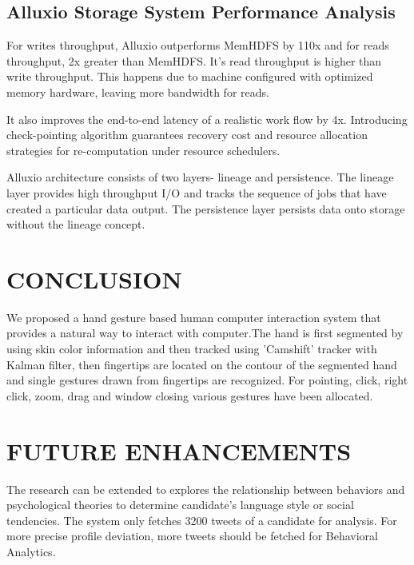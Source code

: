 \documentclass[oneside,a4paper,12pt]{pictreport}
\begin{document}
\section{Alluxio Storage System Performance Analysis}
\hspace{1.1cm}For writes throughput, Alluxio outperforms MemHDFS by 110x and for reads throughput, 2x greater than MemHDFS. It's read throughput is higher than write throughput. This happens due to machine configured with optimized memory hardware, leaving more bandwidth for reads.
\par It also improves the end-to-end latency of a realistic work flow by 4x. Introducing check-pointing algorithm guarantees recovery cost and resource allocation strategies for re-computation under resource schedulers.
\par Alluxio architecture consists of two layers- lineage and persistence. The
lineage layer provides high throughput I/O and tracks the sequence of jobs that have created a particular data output. The persistence layer persists data onto storage without the lineage concept.


\chapter{CONCLUSION}
We proposed a hand gesture based human computer
interaction system that provides a  natural  way to interact with computer.The hand is first segmented  by using skin color information and then tracked using 'Camshift' tracker with Kalman filter, then fingertips are located on the contour of the segmented hand and single gestures drawn from fingertips are recognized. For  pointing, click, right click, zoom, drag and window closing various gestures have been allocated.

\chapter{FUTURE ENHANCEMENTS} 
The research can be extended to explores the relationship between behaviors and psychological theories to determine candidate's language style or social tendencies. The system only fetches 3200 tweets of a candidate for analysis. For more precise profile deviation, more tweets should be fetched for Behavioral Analytics. 
\end{document}
